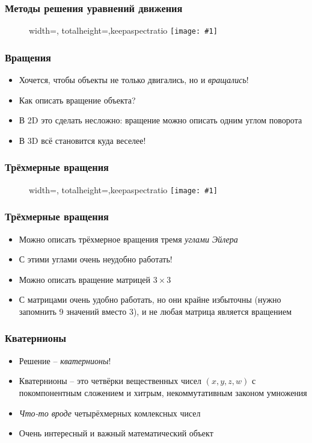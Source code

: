 \documentclass[10pt]{beamer}
\newcommand{\slideimage}[1]{
  \begin{figure}
    \begin{adjustbox}{width=\textwidth, totalheight=\textheight-2\baselineskip-2\baselineskip,keepaspectratio}
      \texttt{[image: \#1]}
    \end{adjustbox}
  \end{figure}
}
\begin{document}
\begin{frame}
\frametitle{Методы решения уравнений движения}
\slideimage{integrators.png}
\end{frame}

\begin{frame}
\frametitle{Вращения}
\begin{itemize}
\item Хочется, чтобы объекты не только двигались, но и \textit{вращались}!
\pause
\item Как описать вращение объекта?
\pause
\item В 2D это сделать несложно: вращение можно описать одним углом поворота
\pause
\item В 3D всё становится куда веселее!
\end{itemize}
\end{frame}

\begin{frame}
\frametitle{Трёхмерные вращения}
\slideimage{euler_angles.png}
\end{frame}

\begin{frame}
\frametitle{Трёхмерные вращения}
\begin{itemize}
\item Можно описать трёхмерное вращения тремя \textit{углами Эйлера}
\pause
\item С этими углами очень неудобно работать!
\pause
\item Можно описать вращение матрицей \begin{math}3\times 3\end{math}
\pause
\item С матрицами очень удобно работать, но они крайне избыточны (нужно запомнить 9 значений вместо 3), и не любая матрица является вращением
\end{itemize}
\end{frame}

\begin{frame}
\frametitle{Кватернионы}
\begin{itemize}
\item Решение -- \textit{кватернионы}!
\pause
\item Кватернионы -- это четвёрки вещественных чисел \begin{math}(x,y,z,w)\end{math} с покомпонентным сложением и хитрым, некоммутативным законом умножения
\pause
\item \textit{Что-то вроде} четырёхмерных комлексных чисел
\pause
\item Очень интересный и важный математический объект
\end{itemize}
\end{frame}
\end{document}
